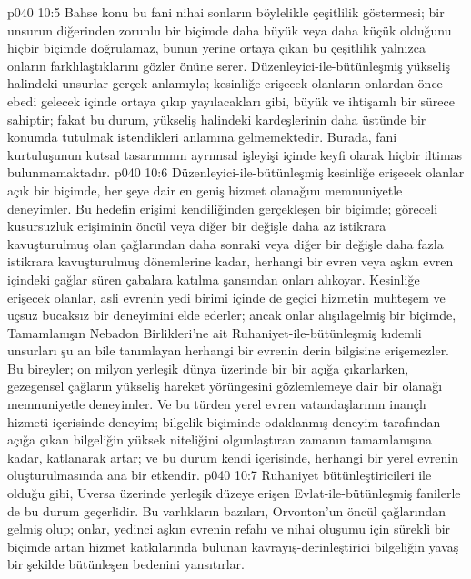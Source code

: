 \vs p040 10:5 Bahse konu bu fani nihai sonların böylelikle çeşitlilik göstermesi; bir unsurun diğerinden zorunlu bir biçimde daha büyük veya daha küçük olduğunu hiçbir biçimde doğrulamaz, bunun yerine ortaya çıkan bu çeşitlilik yalnızca onların farklılaştıklarını gözler önüne serer. Düzenleyici\hyp{}ile\hyp{}bütünleşmiş yükseliş halindeki unsurlar gerçek anlamıyla; kesinliğe erişecek olanların onlardan önce ebedi gelecek içinde ortaya çıkıp yayılacakları gibi, büyük ve ihtişamlı bir sürece sahiptir; fakat bu durum, yükseliş halindeki kardeşlerinin daha üstünde bir konumda tutulmak istendikleri anlamına gelmemektedir. Burada, fani kurtuluşunun kutsal tasarımının ayrımsal işleyişi içinde keyfi olarak hiçbir iltimas bulunmamaktadır.
\vs p040 10:6 Düzenleyici\hyp{}ile\hyp{}bütünleşmiş kesinliğe erişecek olanlar açık bir biçimde, her şeye dair en geniş hizmet olanağını memnuniyetle deneyimler. Bu hedefin erişimi kendiliğinden gerçekleşen bir biçimde; göreceli kusursuzluk erişiminin öncül veya diğer bir değişle daha az istikrara kavuşturulmuş olan çağlarından daha sonraki veya diğer bir değişle daha fazla istikrara kavuşturulmuş dönemlerine kadar, herhangi bir evren veya aşkın evren içindeki çağlar süren çabalara katılma şansından onları alıkoyar. Kesinliğe erişecek olanlar, asli evrenin yedi birimi içinde de geçici hizmetin muhteşem ve uçsuz bucaksız bir deneyimini elde ederler; ancak onlar alışılagelmiş bir biçimde, Tamamlanışın Nebadon Birlikleri’ne ait Ruhaniyet\hyp{}ile\hyp{}bütünleşmiş kıdemli unsurları şu an bile tanımlayan herhangi bir evrenin derin bilgisine erişemezler. Bu bireyler; on milyon yerleşik dünya üzerinde bir bir açığa çıkarlarken, gezegensel çağların yükseliş hareket yörüngesini gözlemlemeye dair bir olanağı memnuniyetle deneyimler. Ve bu türden yerel evren vatandaşlarının inançlı hizmeti içerisinde deneyim;  bilgelik biçiminde odaklanmış deneyim tarafından açığa çıkan bilgeliğin yüksek niteliğini olgunlaştıran zamanın tamamlanışına kadar, katlanarak artar; ve bu durum kendi içerisinde, herhangi bir yerel evrenin oluşturulmasında ana bir etkendir.
\vs p040 10:7 Ruhaniyet bütünleştiricileri ile olduğu gibi, Uversa üzerinde yerleşik düzeye erişen Evlat\hyp{}ile\hyp{}bütünleşmiş fanilerle de bu durum geçerlidir. Bu varlıkların bazıları, Orvonton’un öncül çağlarından gelmiş olup; onlar, yedinci aşkın evrenin refahı ve nihai oluşumu için sürekli bir biçimde artan hizmet katkılarında bulunan kavrayış\hyp{}derinleştirici bilgeliğin yavaş bir şekilde bütünleşen bedenini yansıtırlar.
